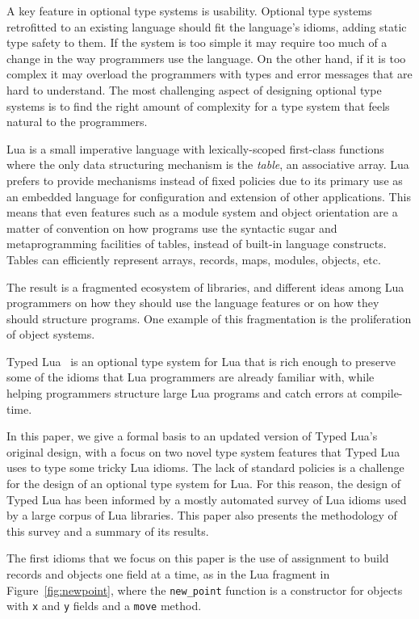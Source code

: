 \documentclass[10pt]{sigplanconf}
\begin{document}
A key feature in optional type systems is usability.
Optional type systems retrofitted to an existing
language should fit the language's idioms, adding
static type safety to them. If the system is too
simple it may require too much of a change in the way
programmers use the language. On the other hand,
if it is too complex it may overload the programmers
with types and error messages that are hard to
understand. The most challenging aspect of designing optional type systems is to find the right amount of complexity for a type system that feels natural to the programmers.

Lua is a small imperative language with lexically-scoped first-class functions where the only data structuring
mechanism is the \emph{table}, an associative array. Lua prefers to provide mechanisms instead of fixed policies due
to its primary use as an embedded language for configuration and
extension of other applications.
This means that even features such as a module system and
object orientation are a matter of convention on how
programs use the syntactic sugar and metaprogramming
facilities of tables, instead of
built-in language constructs. Tables can efficiently represent arrays, records, maps, modules,
objects, etc. 

The result is a fragmented ecosystem of libraries, and different
ideas among Lua programmers on how they should use the language
features or on how they should structure programs. One example
of this fragmentation is the proliferation of object systems.

Typed Lua~\cite{maidl2014tl,maidl2015tl} is an optional type system for
Lua that is rich enough to preserve some of the idioms
that Lua programmers are already familiar with, while
helping programmers structure large Lua programs and
catch errors at compile-time. 

In this paper, we give a formal basis to an updated version of Typed Lua's original design, with a focus on two novel type system
features that Typed Lua uses to type some tricky Lua idioms.
The lack of standard policies is a challenge for the design of
an optional type system for Lua. For this reason, the design
of Typed Lua has been informed by a mostly automated survey
of Lua idioms used by a large corpus of Lua libraries.
This paper also presents the methodology of this survey and
a summary of its results.

The first idioms that we focus on this paper is the use of assignment to build records and objects one field at a time, as in
the Lua fragment in Figure~\ref{fig:newpoint}, where the {\tt new\_point} function
is a constructor for objects with {\tt x} and {\tt y}
fields and a {\tt move} method.
\end{document}
